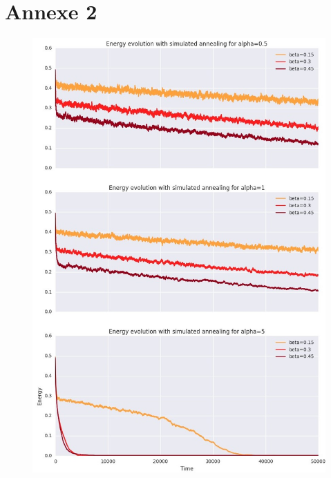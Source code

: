 \documentclass[twocolumn]{article}
\begin{document}
\section{Annexe 2}
\begin{figure}[!h]
	\includegraphics[width=\columnwidth]{../tobekept/skype_1.jpg}
\end{figure}
\end{document}
